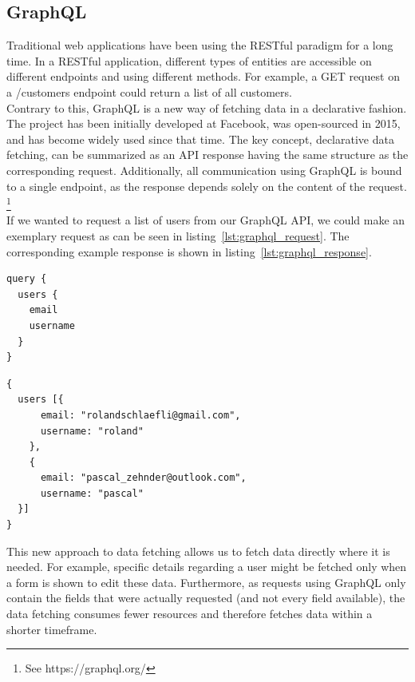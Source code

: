 \subsection{GraphQL}

Traditional web applications have been using the RESTful paradigm for a long time. In a RESTful application, different types of entities are accessible on different endpoints and using different methods. For example, a GET request on a /customers endpoint could return a list of all customers.\\

Contrary to this, GraphQL is a new way of fetching data in a declarative fashion. The project has been initially developed at Facebook, was open-sourced in 2015, and has become widely used since that time. The key concept, declarative data fetching, can be summarized as an API response having the same structure as the corresponding request. Additionally, all communication using GraphQL is bound to a single endpoint, as the response depends solely on the content of the request. \footnote{See https://graphql.org/}\\

If we wanted to request a list of users from our GraphQL API, we could make an exemplary request as can be seen in listing~\ref{lst:graphql_request}. The corresponding example response is shown in listing~\ref{lst:graphql_response}.

\begin{multicols}{2}
  \vspace*{\fill}
  \begin{lstlisting}[caption=GraphQL request, label=lst:graphql_request]
query {
  users {
    email
    username
  }
}
  \end{lstlisting}
  \columnbreak
  \begin{lstlisting}[caption=GraphQL response, label=lst:graphql_response]
{
  users [{
      email: "rolandschlaefli@gmail.com",
      username: "roland"
    },
    {
      email: "pascal_zehnder@outlook.com",
      username: "pascal"
  }]
}
  \end{lstlisting}
\end{multicols}

This new approach to data fetching allows us to fetch data directly where it is needed. For example, specific details regarding a user might be fetched only when a form is shown to edit these data. Furthermore, as requests using GraphQL only contain the fields that were actually requested (and not every field available), the data fetching consumes fewer resources and therefore fetches data within a shorter timeframe.


